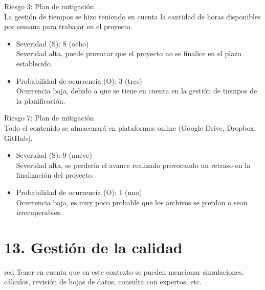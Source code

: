\documentclass[11pt]{charter}
\begin{document}
Riesgo 3: Plan de mitigación \\
La gestión de tiempos se hizo teniendo en cuenta la cantidad de horas disponibles por semana para trabajar en el proyecto.
\begin{itemize}
\item Severidad (S): 8 (ocho) \\
Severidad alta, puede provocar que el proyecto no se finalice en el plazo establecido.
\item Probabilidad de ocurrencia (O): 3 (tres) \\
Ocurrencia baja, debido a que se tiene en cuenta en la gestión de tiempos de la planificación.
\end{itemize} 

Riesgo 7: Plan de mitigación \\
Todo el contenido se almacenará en plataformas online (Google Drive, Dropbox, GitHub).
\begin{itemize}
\item Severidad (S): 9 (nueve) \\
Severidad alta, se perdería el avance realizado provocando un retraso en la finalización del proyecto.
\item Probabilidad de ocurrencia (O): 1 (uno) \\
Ocurrencia baja, es muy poco probable que los archivos se pierdan o sean irrecuperables.
\end{itemize}

\section{13. Gestión de la calidad}
\label{sec:calidad}

\begin{consigna}{red}
Tener en cuenta que en este contexto se pueden mencionar simulaciones, cálculos, revisión de hojas de datos, consulta con expertos, etc.
\end{consigna}
\end{document}
